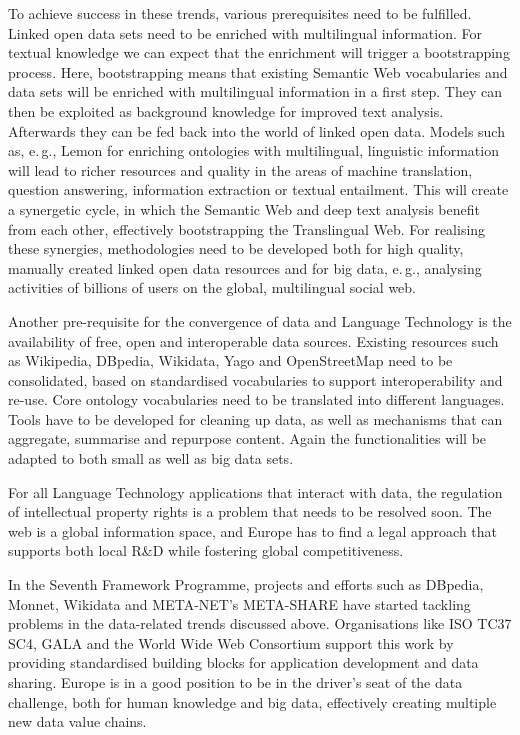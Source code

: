 \documentclass[10pt, plain]{../../metanetpaper}
\begin{document}
\begin{multicols}{2}
To achieve success in these trends, various prerequisites need to be fulfilled. Linked open data sets need to be enriched with multilingual information. For textual knowledge we can expect that the enrichment will trigger a bootstrapping process. Here, bootstrapping means that existing Semantic Web vocabularies and data sets will be enriched with multilingual information in a first step. They can then be exploited as background knowledge for improved text analysis. Afterwards they can be fed back into the world of linked open data. Models such as, e.\,g., Lemon for enriching ontologies with multilingual, linguistic information will lead to richer resources and quality in the areas of machine translation, question answering, information extraction or textual entailment. This will create a synergetic cycle, in which the Semantic Web and deep text analysis benefit from each other, effectively bootstrapping the Translingual Web. For realising these synergies, methodologies need to be developed both for high quality, manually created linked open data resources and for big data, e.\,g., analysing activities of billions of users on the global, multilingual social web.

Another pre-requisite for the convergence of data and Language Technology is the availability of free, open and interoperable data sources. Existing resources such as Wikipedia, DBpedia, Wikidata, Yago and OpenStreetMap need to be consolidated, based on standardised vocabularies to support interoperability and re-use. Core ontology vocabularies need to be translated into different languages. Tools have to be developed for cleaning up data, as well as mechanisms that can aggregate, summarise and repurpose content. Again the functionalities will be adapted to both small as well as big data sets.

For all Language Technology applications that interact with data, the regulation of intellectual property rights is a problem that needs to be resolved soon. The web is a global information space, and Europe has to find a legal approach that supports both local R\&D while fostering global competitiveness.

In the Seventh Framework Programme, projects and efforts such as DBpedia, Monnet, Wikidata and META-NET's META-SHARE have started tackling problems in the data-related trends discussed above. Organisations like ISO TC37 SC4, GALA and the World Wide Web Consortium  support this work by providing standardised building blocks for application development and data sharing. Europe is in a good position to be in the driver's seat of the data challenge, both for human knowledge and big data, effectively creating multiple new data value chains.


\end{multicols}
\end{document}
